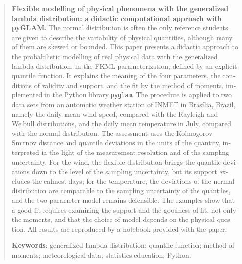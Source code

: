 \begin{otherlanguage}{english}
\begin{abstract}
\noindent\textbf{Flexible modelling of physical phenomena with the generalized lambda distribution: a didactic computational approach with pyGLAM.}
The normal distribution is often the only reference students are given to describe the variability of physical quantities, although many of them are skewed or bounded. This paper presents a didactic approach to the probabilistic modelling of real physical data with the generalized lambda distribution, in the FKML parameterization, defined by an explicit quantile function. It explains the meaning of the four parameters, the conditions of validity and support, and the fit by the method of moments, implemented in the Python library \texttt{pyglam}. The procedure is applied to two data sets from an automatic weather station of INMET in Brasília, Brazil, namely the daily mean wind speed, compared with the Rayleigh and Weibull distributions, and the daily mean temperature in July, compared with the normal distribution. The assessment uses the Kolmogorov-Smirnov distance and quantile deviations in the units of the quantity, interpreted in the light of the measurement resolution and of the sampling uncertainty. For the wind, the flexible distribution brings the quantile deviations down to the level of the sampling uncertainty, but its support excludes the calmest days; for the temperature, the deviations of the normal distribution are comparable to the sampling uncertainty of the quantiles, and the two-parameter model remains defensible. The examples show that a good fit requires examining the support and the goodness of fit, not only the moments, and that the choice of model depends on the physical question. All results are reproduced by a notebook provided with the paper.

\medskip
\noindent\textbf{Keywords}: generalized lambda distribution; quantile function; method of moments; meteorological data; statistics education; Python.
\end{abstract}
\end{otherlanguage}
